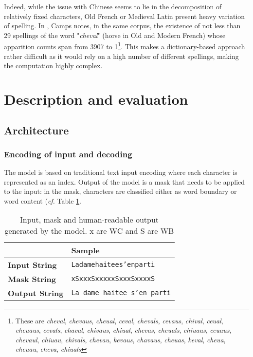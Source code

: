 \documentclass{jdmdh}
\begin{document}
Indeed, while the issue with Chinese seems to lie in the decomposition of relatively fixed characters, Old French or Medieval Latin present heavy variation of spelling. In \citet{camps_pandora}, Camps notes, in the same corpus, the existence of not less than 29 spellings of the word "\textit{cheval}" (horse in Old and Modern French) whose apparition counts span from 3907 to 1\footnote{These are \textit{cheval}, \textit{chevaus}, \textit{cheual}, \textit{ceval}, \textit{chevals}, \textit{cevaus}, \textit{chival}, \textit{ceual}, \textit{cheuaus}, \textit{cevals}, \textit{chaval}, \textit{chivaus}, \textit{chiual}, \textit{chevas}, \textit{cheuals}, \textit{chiuaus}, \textit{ceuaus}, \textit{chevaul}, \textit{chiuau}, \textit{chivals}, \textit{chevau}, \textit{kevaus}, \textit{chavaus}, \textit{cheuas}, \textit{keval}, \textit{cheua}, \textit{cheuau}, \textit{cheva}, \textit{chiuals}}. This  makes a dictionary-based approach rather difficult as it would rely on a high number of different spellings, making the computation highly complex.

\section{Description and evaluation}

\subsection{Architecture}

\subsubsection{Encoding of input and decoding}

The model is based on traditional text input encoding where each character is represented as an index. Output of the model is a mask that needs to be applied to the input: in the mask, characters are classified either as word boundary or word content (\textit{cf.} Table \ref{lst:input_output_example}.

\begin{table}[!ht]
\centering
\begin{tabular}{@{}ll@{}}
\hline
                       & \textbf{Sample}           \\  \hline
\textbf{Input  String} & \texttt{Ladamehaitees'enparti}     \\
\textbf{Mask   String} & \texttt{xSxxxSxxxxxSxxxSxxxxS}     \\
\textbf{Output String} & \texttt{La dame haitee s'en parti} \\ \hline
\end{tabular}
  \caption{Input, mask and human-readable output generated by the model. x are WC and S are WB}
  \label{lst:input_output_example}
\end{table}
\end{document}
